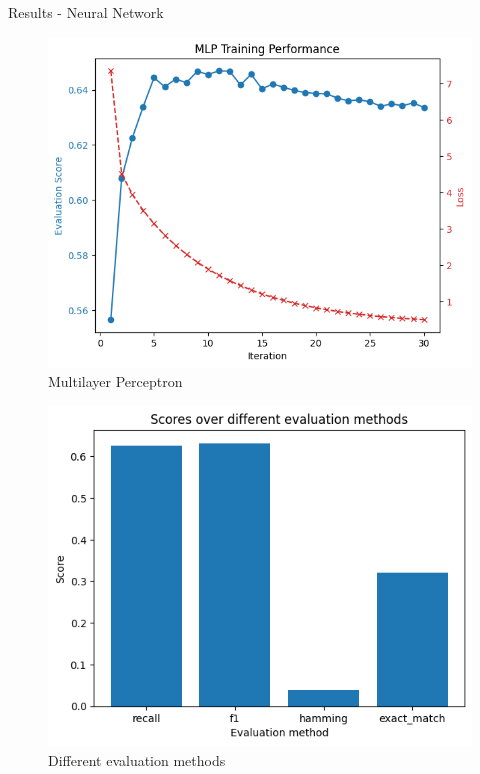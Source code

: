 \documentclass{beamer}
\begin{document}
\begin{frame}[t]{Results - Neural Network}
 {
	\vspace{-3mm}
	\begin{figure}[h]
		\caption{Multilayer Perceptron}
		\centering
		\includegraphics[width=0.73\linewidth]{images/MLP/mlp_over_iters.png}
	\end{figure}
}

\pause
{} {
	\vspace{-3mm}
	\begin{figure}[h]
		\caption{Different evaluation methods}
		\centering
		\includegraphics[width=0.73\linewidth]{images/MLP/mlp_over_evals.png}
	\end{figure}
}
\end{frame}
\end{document}
